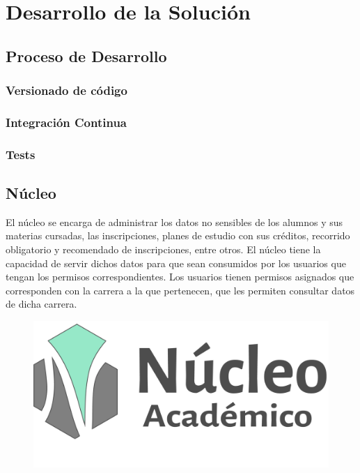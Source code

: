 \chapter{Desarrollo de la Solución}
\label{sec:desarrollo}

\section[Proceso de Desarrollo]{Proceso de Desarrollo}

\subsection{Versionado de código}

\subsection{Integración Continua}

\subsection{Tests}

\section[Núcleo]{Núcleo}

El núcleo se encarga de administrar los datos no sensibles de los alumnos y sus materias cursadas, las inscripciones, planes de estudio con sus créditos, recorrido obligatorio y recomendado de inscripciones, entre otros.
El núcleo tiene la capacidad de servir dichos datos para que sean consumidos por los usuarios que tengan los permisos correspondientes.
Los usuarios tienen permisos asignados que corresponden con la carrera a la que pertenecen, que les permiten consultar datos de dicha carrera. 






\begin{figure}[h!]
  \centering
    \includegraphics[scale=0.5]{images/nucleo/nucleo-fondoblanco.png}
  \label{fig:django}
\end{figure}

